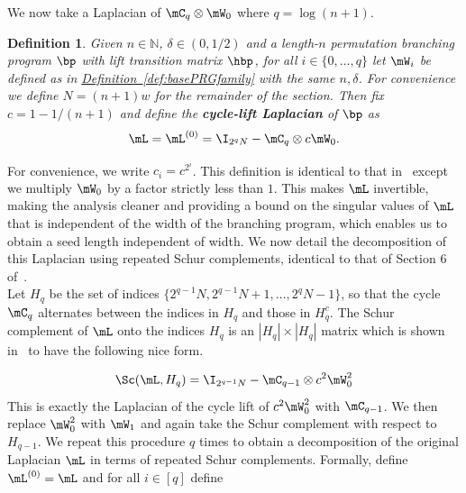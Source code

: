 \documentclass[11pt]{article}
\newcommand{\expref}[2]{\texorpdfstring{\hyperref[#2]{#1~\ref{#2}}}{#1~\ref{#2}}}
\newtheorem{definition}[theorem]{Definition}
\newcommand{\N}{{\mathbb N}}
\begin{document}
We now take a Laplacian of $\mC_q\otimes \mW_0$ where $q=\log(n+1)$. 
\begin{definition}\label{def:cycleDecomp}
Given $n\in \N$, $\delta\in(0,1/2)$ and a length-$n$ permutation branching program $\bp$ with lift transition matrix $\hbp$, for all $i\in \{0,\dots,q\}$ let $\mW_i$ be defined as in \expref{Definition}{def:basePRGfamily} with the same $n,\delta$. For convenience we define $N=(n+1)w$ for the remainder of the section. Then fix $c=1-1/(n+1)$ and define the \textbf{cycle-lift Laplacian} of $\bp$ as
$$\mL=\mL^{(0)}=\I_{2^qN}-\mC_q\otimes c\mW_0.$$
\end{definition}
For convenience, we write $c_i=c^{2^i}$. This definition is identical to that in~\cite{AhmadinejadKeMuPeSiVa19} except we multiply $\mW_0$ by a factor strictly less than $1$. This makes $\mL$ invertible, making the analysis cleaner and providing a bound on the singular values of $\mL$ that is independent of the width of the branching program, which enables us to obtain a seed length independent of width. We now detail the decomposition of this Laplacian using repeated Schur complements, identical to that of Section 6 of~\cite{AhmadinejadKeMuPeSiVa19}.\\

Let $H_q$ be the set of indices $\{2^{q-1}N,2^{q-1}N+1,\dots ,2^q N-1\}$, so that the cycle $\mC_q$ alternates between the indices in $H_q$ and those in $H^c_q$. The Schur complement of $\mL$ onto the indices $H_q$ is an $|H_q|\times|H_q|$ matrix which is shown in~\cite{AhmadinejadKeMuPeSiVa19} to have the following nice form. %

\[\Sc(\mL,H_q)=\I_{2^{q-1}N}-\mC_{q-1}\otimes c^2\mW_0^2\]
This is exactly the Laplacian of the cycle lift of $c^2\mW_0^2$ with $\mC_{q-1}$. We then replace $\mW_0^2$ with $\mW_1$ and again take the Schur complement with respect to $H_{q-1}$. We repeat this procedure $q$ times to obtain a decomposition of the original Laplacian $\mL$ in terms of repeated Schur complements. Formally, define $\mL^{(0)}=\mL$ and for all $i\in [q]$ define
\end{document}
